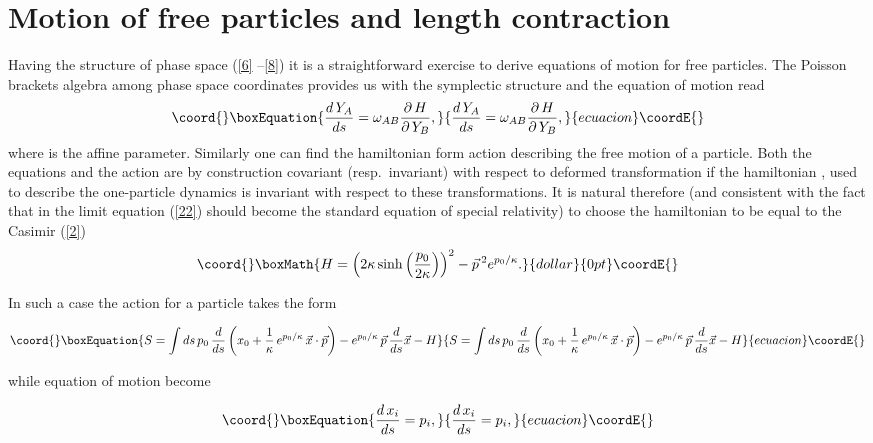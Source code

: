 \documentclass[a4paper,a4paper]{article}
\begin{document}
\section{Motion of free particles and length contraction}

Having the structure of phase space (\ref{6} --\ref{8}) it is a straightforward exercise to derive equations of motion for free particles. The Poisson brackets algebra among phase space coordinates \coordHE{} provides us with the symplectic structure \coordHE{} and the equation of motion read
\begin{equation}\coord{}\boxEquation{\label{22}
 \frac{d\, Y_A}{d s} = \omega_{AB} \frac{\partial\, H}{\partial\,Y_B},
}{\frac{d\, Y_A}{d s} = \omega_{AB} \frac{\partial\, H}{\partial\,Y_B},
}{ecuacion}\coordE{}\end{equation}
where \coordHE{} is the affine parameter. Similarly one can find the hamiltonian form action describing the free motion of a particle.
Both the equations and the action are by construction covariant (resp.~invariant) with respect to deformed transformation if the hamiltonian \coordHE{}, used to describe the one-particle dynamics is  invariant with respect to these transformations. It is natural therefore (and consistent with the fact that in the limit \myHighlight{$\kappa\rightarrow\infty$}\coordHE{} equation (\ref{22}) should become the standard equation of special relativity) to choose the hamiltonian to be equal to the Casimir (\ref{2})
$$\coord{}\boxMath{ H = \left(2\kappa \sinh\left(\frac{p_0}{2\kappa}\right)\right)^2 - \vec{p}\,{}^2 e^{p_0/\kappa}.}{dollar}{0pt}\coordE{}$$

In such  a case the action for a particle takes the form

\begin{equation}\coord{}\boxEquation{\label{22a}
  S = \int ds \, p_0 \, \frac{d}{ds} \left( x_0 + \frac1\kappa\, e^{p_0/\kappa}\, \vec{x}\cdot \vec{p} \right) - e^{p_0/\kappa}\, \vec{p} \, \frac{d}{ds} \vec{x} - H
}{S = \int ds \, p_0 \, \frac{d}{ds} \left( x_0 + \frac1\kappa\, e^{p_0/\kappa}\, \vec{x}\cdot \vec{p} \right) - e^{p_0/\kappa}\, \vec{p} \, \frac{d}{ds} \vec{x} - H
}{ecuacion}\coordE{}\end{equation}

while equation of motion become

\begin{equation}\coord{}\boxEquation{\label{23}
  \frac{d\, x_i}{ds} = p_i,
}{\frac{d\, x_i}{ds} = p_i,
}{ecuacion}\coordE{}\end{equation}
\end{document}
